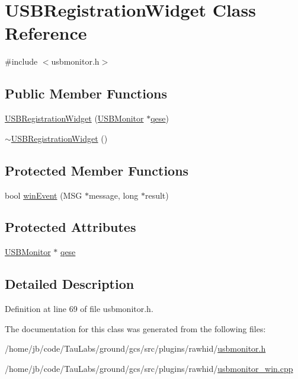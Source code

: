 \hypertarget{class_u_s_b_registration_widget}{\section{\-U\-S\-B\-Registration\-Widget \-Class \-Reference}
\label{class_u_s_b_registration_widget}
}


{\ttfamily \#include $<$usbmonitor.\-h$>$}

\subsection*{\-Public \-Member \-Functions}
\begin{DoxyCompactItemize}
\item 
\hyperlink{group___raw_h_i_d_plugin_gaeaf0fb927142afa4e4233bfbd8fcb989}{\-U\-S\-B\-Registration\-Widget} (\hyperlink{class_u_s_b_monitor}{\-U\-S\-B\-Monitor} $\ast$\hyperlink{group___raw_h_i_d_plugin_ga0cc367841d16c562f474b130448cc184}{qese})
\item 
\hyperlink{group___raw_h_i_d_plugin_gaba711458acab7c2f26fbe576a10291c2}{$\sim$\-U\-S\-B\-Registration\-Widget} ()
\end{DoxyCompactItemize}
\subsection*{\-Protected \-Member \-Functions}
\begin{DoxyCompactItemize}
\item 
bool \hyperlink{group___raw_h_i_d_plugin_gacce70fd01437c66b524cc2f512ceece6}{win\-Event} (\-M\-S\-G $\ast$message, long $\ast$result)
\end{DoxyCompactItemize}
\subsection*{\-Protected \-Attributes}
\begin{DoxyCompactItemize}
\item 
\hyperlink{class_u_s_b_monitor}{\-U\-S\-B\-Monitor} $\ast$ \hyperlink{group___raw_h_i_d_plugin_ga0cc367841d16c562f474b130448cc184}{qese}
\end{DoxyCompactItemize}


\subsection{\-Detailed \-Description}


\-Definition at line 69 of file usbmonitor.\-h.



\-The documentation for this class was generated from the following files\-:\begin{DoxyCompactItemize}
\item 
/home/jb/code/\-Tau\-Labs/ground/gcs/src/plugins/rawhid/\hyperlink{usbmonitor_8h}{usbmonitor.\-h}\item 
/home/jb/code/\-Tau\-Labs/ground/gcs/src/plugins/rawhid/\hyperlink{usbmonitor__win_8cpp}{usbmonitor\-\_\-win.\-cpp}\end{DoxyCompactItemize}
